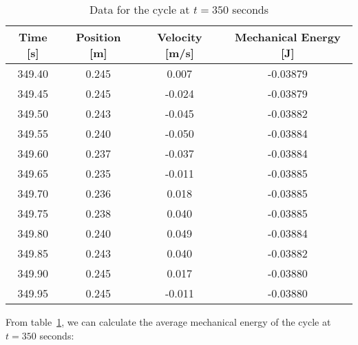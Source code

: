 \documentclass[titlepage]{article}
\begin{document}
            \begin{table}[H]
                \small
                \centering
                \begin{tabular}{|c|c|c|c|}
                    \hline
                    Time [s] & Position [m] & Velocity [m/s] & Mechanical Energy [J] \\
                    \hline
                    349.40   & 0.245        & 0.007          & -0.03879              \\
                    \hline
                    349.45   & 0.245        & -0.024         & -0.03879              \\
                    \hline
                    349.50   & 0.243        & -0.045         & -0.03882              \\
                    \hline
                    349.55   & 0.240        & -0.050         & -0.03884              \\
                    \hline
                    349.60   & 0.237        & -0.037         & -0.03884              \\
                    \hline
                    349.65   & 0.235        & -0.011         & -0.03885              \\
                    \hline
                    349.70   & 0.236        & 0.018          & -0.03885              \\
                    \hline
                    349.75   & 0.238        & 0.040          & -0.03885              \\
                    \hline
                    349.80   & 0.240        & 0.049          & -0.03884              \\
                    \hline
                    349.85   & 0.243        & 0.040          & -0.03882              \\
                    \hline
                    349.90   & 0.245        & 0.017          & -0.03880              \\
                    \hline
                    349.95   & 0.245        & -0.011         & -0.03880              \\
                    \hline
                \end{tabular}
                \caption{Data for the cycle at $t=350$ seconds}\label{tab:cycle-at-350-seconds-mechanical-energy-table}
            \end{table}
            
            From table~\ref{tab:cycle-at-350-seconds-mechanical-energy-table}, we can calculate the average mechanical energy of the cycle at $t=350$ seconds:
            
\end{document}
